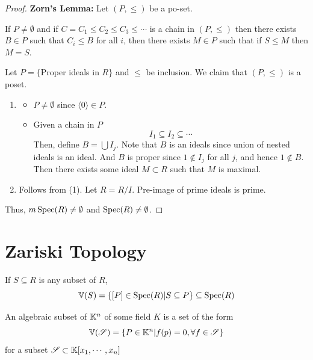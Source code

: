 \documentclass[12pt]{amsart}
\begin{document}
\begin{proof}
    \textbf{Zorn's Lemma:} Let $(P, \leq)$ be a po-set. 
    
    If $P \neq \emptyset$ and if $C = C_1 \leq C_2 \leq C_3 \leq \cdots$ is a chain in $(P, \leq)$ then there exists $B \in P$ such that $C_i \leq B$ for all $i$, then there exists $M \in P$ such that  if $S \leq M$ then $M = S$. 

    Let $P = \{$Proper ideals in $ R\}$ and $\leq$ be inclusion. We claim that $(P, \leq)$ is a poset. 

    \begin{enumerate}
        \item \begin{itemize}
            \item $P \neq \emptyset$ since $\langle 0 \rangle \in P$. 
            \item Given a chain in $P$ 
        \[I_1 \subseteq I_2 \subseteq \cdots\]
        Then, define $B = \bigcup I_j$. Note that $B$ is an ideals since union of nested ideals is an ideal. And $B$ is proper since $1 \notin I_j$ for all $j$, and hence $1 \notin B$. Then there exists some ideal $M \subset R$ such that  $M$ is maximal. 
        \end{itemize}
        \item Follows from (1). Let $R = R/I$. Pre-image of prime ideals is prime. 
    \end{enumerate}
    Thus, $m\operatorname{Spec}(R) \neq \emptyset$ and $\operatorname{Spec}(R) \neq \emptyset$. 
\end{proof}

\section{Zariski Topology}

\begin{definition}
    If $S \subseteq R$ is any subset of $R$, 
    \[\mathbb V(S) = \{[P] \in \operatorname{Spec} (R) | S \subseteq P\} \subseteq \operatorname{Spec} (R)\]
\end{definition}

\begin{definition}
    An algebraic subset of $\mathbb K^n$ of some field $K$ is a set of the form \[\mathbb V(\operatorname{\mathscr S}) = \{P \in \mathbb K^n | f(p) = 0, \forall f \in \operatorname{\mathscr S}\}\] for a subset $\operatorname{\mathscr S} \subset \mathbb K[x_1, \cdots, x_n]$
\end{definition}
\end{document}
